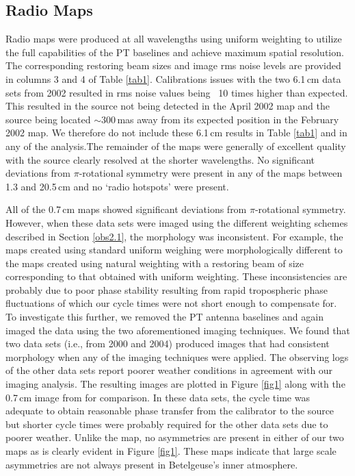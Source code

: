 \documentclass[iop]{emulateapj}
\begin{document}
\subsection{Radio Maps}
Radio maps were produced at all wavelengths using uniform weighting to utilize the full capabilities of the PT baselines and achieve maximum spatial resolution. The corresponding restoring beam sizes and image rms noise levels are provided in columns 3 and 4 of Table \ref{tab1}. Calibrations issues with the two 6.1\,cm data sets from 2002 resulted in rms noise values being ~10 times higher than expected. This resulted in the source not being detected in the April 2002 map and the source being located $\sim 300$\,mas away from its expected position in the February 2002 map. We therefore do not include these 6.1\,cm results in Table \ref{tab1} and in any of the analysis.The remainder of the maps were generally of excellent quality with the source clearly resolved at the shorter wavelengths. No significant deviations from $\pi$-rotational symmetry were present in any of the maps between 1.3 and 20.5\,cm and no `radio hotspots' were present.

All of the 0.7\,cm maps showed significant deviations from $\pi$-rotational symmetry. However, when these data sets were imaged using the different weighting schemes described in Section \ref{obs2.1}, the morphology was inconsistent. For example, the maps created using standard uniform weighing were morphologically different to the maps created using natural weighting with a restoring beam of size corresponding to that obtained with uniform weighting. These inconsistencies are probably due to poor phase stability resulting from rapid tropospheric phase fluctuations of which our cycle times were not short enough to compensate for. To investigate this further, we removed the PT antenna baselines and again imaged the data using the two aforementioned imaging techniques. We found that two data sets (i.e., from 2000 and 2004) produced images that had consistent morphology when any of the imaging techniques were applied. The observing logs of the other data sets report poorer weather conditions in agreement with our imaging analysis. The resulting images are plotted in Figure \ref{fig1} along with the 0.7\,cm image from \cite{lim_1998} for comparison. In these data sets, the cycle time was adequate to obtain reasonable phase transfer from the calibrator to the source but shorter cycle times were probably required for the other data sets due to poorer weather. Unlike the \cite{lim_1998} map, no asymmetries are present in either of our two maps as is clearly evident in Figure \ref{fig1}. These maps indicate that large scale asymmetries are not always present in Betelgeuse's inner atmosphere.
\end{document}
